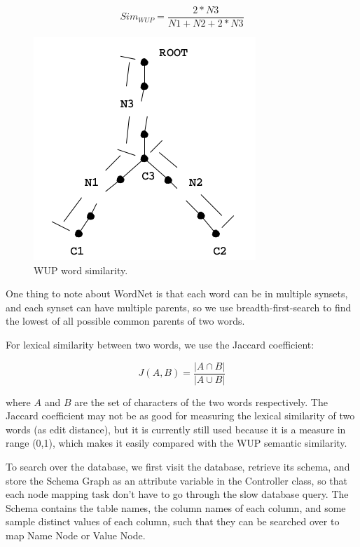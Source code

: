 \documentclass[twocolumn]{article}
\begin{document}
$$ Sim_{WUP} = \frac{2*N3}{N1+N2+2*N3} $$

\begin{figure}[ht]
  \centering
  \includegraphics[width=0.7\linewidth]{figures/wordnet_tree.png}
  \caption[caption for wordnet tree]{WUP word similarity.\protect\footnotemark }
\end{figure}

One thing to note about WordNet is that each word can be in multiple synsets, and each synset can have multiple parents, so we use breadth-first-search to find the lowest of all possible common parents of two words.


For lexical similarity between two words, we use the Jaccard coefficient:

$$ J(A, B) = \frac{|A \cap B|}{|A \cup B|}$$

where $A$ and $B$ are the set of characters of the two words respectively. The Jaccard coefficient may not be as good for measuring the lexical similarity of two words (as edit distance), but it is currently still used because it is a measure in range (0,1), which makes it easily compared with the WUP semantic similarity.

To search over the database, we first visit the database, retrieve its schema, and store the Schema Graph as an attribute variable in the Controller class, so that each node mapping task don’t have to go through the slow database query. The Schema contains the table names, the column names of each column, and some sample distinct values of each column, such that they can be searched over to map Name Node or Value Node.
\end{document}
